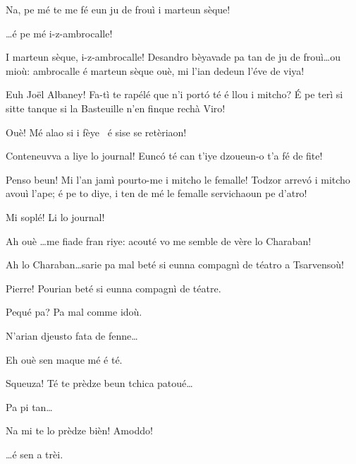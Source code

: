\begin{drama}
\Francescaspeaks  Na, pe mé te me fé eun ju de frouì i marteun sèque!

\Joellespeaks \ldots é pe mé i-z-ambrocalle!

\Joelspeaks{} I marteun sèque, i-z-ambrocalle! Desandro bèyavade pa tan de ju de frouì\ldots ou mioù: ambrocalle é marteun sèque ouè, mi l'ian dedeun l'éve de viya!


\Francescaspeaks Euh Jo\"{e}l Albaney! Fa-tì te rapélé que n'i portó té é llou  i mitcho? \'E pe terì si sitte tanque si la Basteuille n'en finque rechà Viro!

\Vetchotspeaks Ouè! Mé alao si i fèye \pecora\ é sise se retèriaon!

\Pierrespeaks{} Conteneuvva a liye lo journal! Euncó té can t'iye dzou\-eun-o t'a fé de fite!

\Vetchotspeaks Penso beun! Mi l'an jamì pourto-me i mitcho le femalle! To\-dzor arrevó i mitcho avouì l’ape; é pe to diye, i ten de mé le femalle servichaoun pe d’atro!

\Joelspeaks Mi soplé! Li lo journal!


\Serventaspeaks Ah ouè \ldots me fiade fran riye: acouté vo me semble de vère lo Charaban!


\Joellespeaks Ah lo Charaban\ldots sarie pa mal beté si eunna compagnì de téatro a Tsarvensoù!

\Joelspeaks Pierre! Pourian beté si eunna compagnì de téatre.
 
\Pierrespeaks Pequé pa? Pa mal comme idoù. 

\Joelspeaks{} N'arian djeusto fata de fenne\ldots

\Pierrespeaks Eh ouè sen maque mé é té.


\Pierrespeaks{} Squeuza! Té te prèdze beun tchica patoué\ldots

\Serventaspeaks  Pa pi tan\ldots

\Joelspeaks Na mi te lo prèdze bièn! Amoddo!

\Pierrespeaks \ldots é sen a trèi.


\end{drama}
